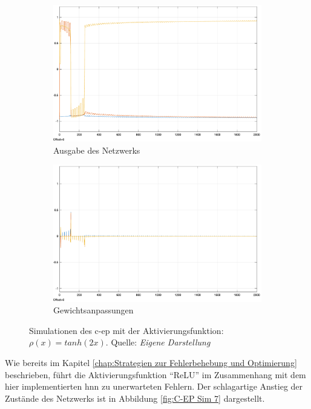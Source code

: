 \begin{figure}[h]
  \centering
  \begin{subfigure}[b]{0.5\textwidth}
    \includegraphics[width=\textwidth]{abbildungen/c_ep_sim_6_ausgabe.png}
    \caption{Ausgabe des Netzwerks}
  \end{subfigure}%
  \hfill
  \begin{subfigure}[b]{0.5\textwidth}
    \includegraphics[width=\textwidth]{abbildungen/c_ep_sim_6_weight_update.png}
    \caption{Gewichtsanpassungen}
  \end{subfigure}
  \caption{Simulationen des \ac{c-ep} mit der Aktivierungsfunktion: \(\rho(x)=tanh(2x)\). Quelle: \textit{Eigene Darstellung}}
  \label{fig:C-EP Sim 6}
\end{figure}

Wie bereits im Kapitel \ref{chap:Strategien zur Fehlerbehebung und Optimierung} beschrieben, führt die Aktivierungsfunktion "`ReLU"' im Zusammenhang mit dem hier implementierten \ac{hnn} zu unerwarteten Fehlern. Der schlagartige Anstieg der Zustände des Netzwerks ist in Abbildung \ref{fig:C-EP Sim 7} dargestellt.

